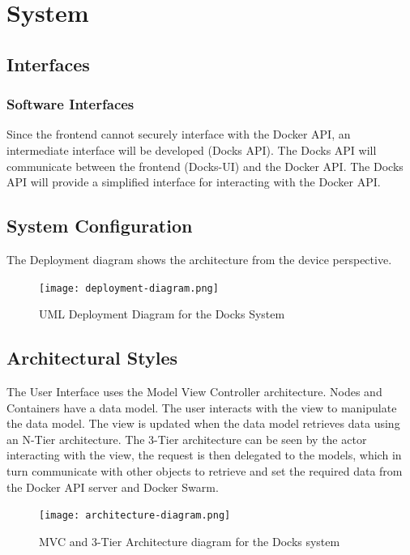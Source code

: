 \documentclass[]{article}
\begin{document}
\section{System}
\subsection{Interfaces}
\subsubsection{Software Interfaces}
Since the frontend cannot securely interface with the Docker API,
an intermediate interface will be developed (Docks API).
The Docks API will communicate between the frontend (Docks-UI) and
the Docker API. The Docks API will provide a simplified interface for
interacting with the Docker API.


\subsection{System Configuration}
The Deployment diagram shows the architecture from the device perspective.

\begin{figure}[H]
	\centering
	\texttt{[image: deployment-diagram.png]}
	\caption{UML Deployment Diagram for the Docks System}
\end{figure}

\subsection{Architectural Styles}

The User Interface uses the Model View Controller architecture.
Nodes and Containers have a data model.
The user interacts with the view to manipulate the data model.
The view is updated when the data model retrieves data using an N-Tier architecture.
The 3-Tier architecture can be seen by the actor interacting with the view,
the request is then delegated to the models, which in turn
communicate with other objects to retrieve and set the required data from
the Docker API server and Docker Swarm.

\begin{figure}[h]
	\centering
	\texttt{[image: architecture-diagram.png]}
	\caption{MVC and 3-Tier Architecture diagram for the Docks system}
\end{figure}
\end{document}
